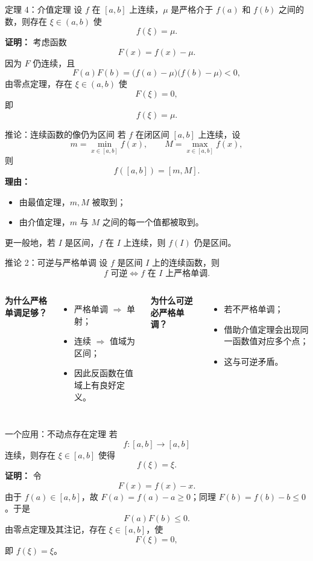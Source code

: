 ﻿\documentclass[aspectratio=169,11pt]{ctexbeamer}
\begin{document}
\begin{frame}{定理 4：介值定理}
设 $f$ 在 $[a,b]$ 上连续，$\mu$ 是严格介于 $f(a)$ 和 $f(b)$ 之间的数，则存在 $\xi\in(a,b)$ 使
\[
  f(\xi)=\mu.
\]
\vspace{0.5em}
\textbf{证明：} 考虑函数
\[
  F(x)=f(x)-\mu.
\]
因为 $F$ 仍连续，且
\[
  F(a)F(b)=\bigl(f(a)-\mu\bigr)\bigl(f(b)-\mu\bigr)<0,
\]
由零点定理，存在 $\xi\in(a,b)$ 使
\[
  F(\xi)=0,
\]
即
\[
  f(\xi)=\mu.
\]
\end{frame}

\begin{frame}{推论：连续函数的像仍为区间}
若 $f$ 在闭区间 $[a,b]$ 上连续，设
\[
  m=\min_{x\in[a,b]}f(x),\qquad M=\max_{x\in[a,b]}f(x),
\]
则
\[
  f([a,b])=[m,M].
\]
\vspace{0.5em}
\textbf{理由：}
\begin{itemize}
  \item 由最值定理，$m,M$ 被取到；
  \item 由介值定理，$m$ 与 $M$ 之间的每一个值都被取到。
\end{itemize}
\vspace{0.5em}
更一般地，若 $I$ 是区间，$f$ 在 $I$ 上连续，则 $f(I)$ 仍是区间。
\end{frame}

\begin{frame}{推论 2：可逆与严格单调}
设 $f$ 是区间 $I$ 上的连续函数，则
\[
  f \text{ 可逆}\Longleftrightarrow f \text{ 在 }I\text{ 上严格单调}.
\]
\begin{columns}[T]
\textbf{为什么严格单调足够？}
\begin{itemize}
  \item 严格单调 $\Rightarrow$ 单射；
  \item 连续 $\Rightarrow$ 值域为区间；
  \item 因此反函数在值域上有良好定义。
\end{itemize}

\textbf{为什么可逆必严格单调？}
\begin{itemize}
  \item 若不严格单调；
  \item 借助介值定理会出现同一函数值对应多个点；
  \item 这与可逆矛盾。
\end{itemize}
\end{columns}
\end{frame}

\begin{frame}{一个应用：不动点存在定理}
若
\[
  f:[a,b]\to[a,b]
\]
连续，则存在 $\xi\in[a,b]$ 使得
\[
  f(\xi)=\xi.
\]
\vspace{0.5em}
\textbf{证明：} 令
\[
  F(x)=f(x)-x.
\]
由于 $f(a)\in[a,b]$，故 $F(a)=f(a)-a\ge 0$；同理 $F(b)=f(b)-b\le 0$。于是
\[
  F(a)F(b)\le 0.
\]
由零点定理及其注记，存在 $\xi\in[a,b]$，使
\[
  F(\xi)=0,
\]
即 $f(\xi)=\xi$。
\end{frame}
\end{document}
